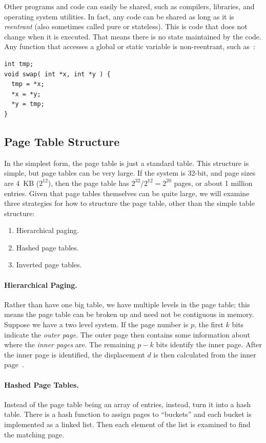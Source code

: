 Other programs and code can easily be shared, such as compilers, libraries, and operating system utilities. In fact, any code can be shared as long as it is \textit{reentrant} (also sometimes called pure or stateless). This is code that does not change when it is executed. That means there is no state maintained by the code. Any function that accesses a global or static variable is non-reentrant, such as~\cite{mte241}:

\begin{verbatim}
int tmp;
void swap( int *x, int *y ) {
  tmp = *x;
  *x = *y;
  *y = tmp; 
}
\end{verbatim}

\subsection*{Page Table Structure}
In the simplest form, the page table is just a standard table. This structure is simple, but page tables can be very large. If the system is 32-bit, and page sizes are 4~KB ($2^{12}$), then the page table has $2^{32}/2^{12} = 2^{20}$ pages, or about 1 million entries. Given that page tables themselves can be quite large, we will examine three strategies for how to structure the page table, other than the simple table structure:

\begin{enumerate}
	\item Hierarchical paging.
	\item Hashed page tables.
	\item Inverted page tables.
\end{enumerate}

\paragraph{Hierarchical Paging.}
Rather than have one big table, we have multiple levels in the page table; this means the page table can be broken up and need not be contiguous in memory. Suppose we have a two level system. If the page number is $p$, the first $k$ bits indicate the \textit{outer page}. The outer page then contains some information about where the \textit{inner pages} are. The remaining $p-k$ bits identify the inner page. After the inner page is identified, the displacement $d$ is then calculated from the inner page~\cite{osc}.

\paragraph{Hashed Page Tables.} 
Instead of the page table being an array of entries, instead, turn it into a hash table. There is a hash function to assign pages to ``buckets'' and each bucket is implemented as a linked list. Then each element of the list is examined to find the matching page.

